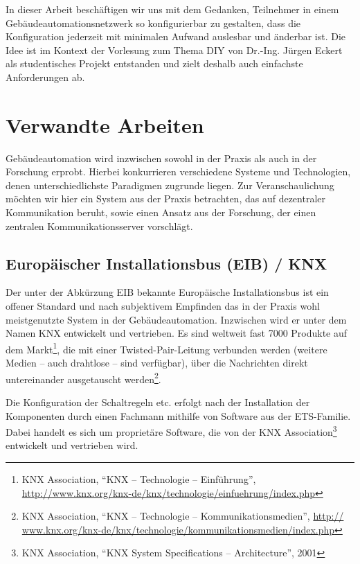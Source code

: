 \documentclass{IEEEtran}
\begin{document}
    In dieser Arbeit beschäftigen wir uns mit dem Gedanken,
    Teilnehmer in einem Gebäudeautomationsnetzwerk so konfigurierbar zu gestalten,
    dass die Konfiguration jederzeit mit minimalen Aufwand auslesbar
    und änderbar ist.
    Die Idee ist im Kontext der Vorlesung zum Thema \ac{DIY} von Dr.-Ing. Jürgen Eckert als studentisches
    Projekt entstanden und zielt deshalb auch einfachste Anforderungen ab.

\section{Verwandte Arbeiten}
    Gebäudeautomation wird inzwischen sowohl in der Praxis
    als auch in der Forschung erprobt. Hierbei konkurrieren verschiedene Systeme
    und Technologien, denen unterschiedlichste Paradigmen zugrunde liegen.
    Zur Veranschaulichung möchten wir hier ein System aus der Praxis betrachten,
    das auf dezentraler Kommunikation beruht,
    sowie einen Ansatz aus der Forschung,
    der einen zentralen Kommunikationsserver vorschlägt.

    \subsection{Europäischer Installationsbus (EIB) / KNX}
    Der unter der Abkürzung EIB bekannte Europäische Installationsbus
    ist ein offener Standard und nach subjektivem Empfinden das in der Praxis
    wohl meistgenutzte System in der Gebäudeautomation.
    Inzwischen wird er unter dem Namen KNX entwickelt und vertrieben.
    Es sind weltweit fast 7000 Produkte auf dem Markt\footnote{ KNX Association, \enquote{KNX -- Technologie -- Einführung}, \url{http://www.knx.org/knx-de/knx/technologie/einfuehrung/index.php}},
    die mit einer Twisted-Pair-Leitung verbunden werden
    (weitere Medien -- auch drahtlose -- sind verfügbar),
    über die Nachrichten direkt untereinander ausgetauscht werden\footnote{KNX Association, \enquote{KNX -- Technologie -- Kommunikationsmedien}, \url{http://
www.knx.org/knx-de/knx/technologie/kommunikationsmedien/index.php}}.

    Die Konfiguration der Schaltregeln etc. erfolgt nach der Installation
    der Komponenten durch einen Fachmann mithilfe von Software aus der
    ETS-Familie. Dabei handelt es sich um proprietäre Software,
    die von der KNX Association\footnote{KNX Association, \enquote{KNX System Specifications -- Architecture}, 2001}
    entwickelt und vertrieben wird.
    
\end{document}
